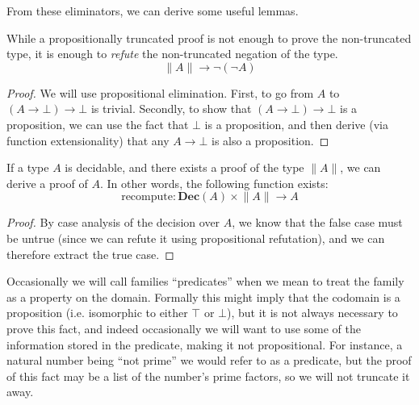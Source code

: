 \begin{refsection}
\begin{subappendices}
From these eliminators, we can derive some useful lemmas.
\begin{lemma}
  While a propositionally truncated proof is not enough to prove the
  non-truncated type, it is enough to \emph{refute} the non-truncated negation
  of the type.
  \begin{equation}
    \lVert A \rVert \rightarrow \neg (\neg A)
  \end{equation}
\end{lemma}
\begin{proof}
  We will use propositional elimination.
  First, to go from \(A\) to \((A \rightarrow \bot) \rightarrow \bot\) is
  trivial.
  Secondly, to show that \((A \rightarrow \bot) \rightarrow \bot\) is a
  proposition, we can use the fact that \(\bot\) is a proposition, and then
  derive (via function extensionality) that any \(A \rightarrow \bot\) is also a
  proposition.
\end{proof}

\begin{lemma}[Recomputation]
  If a type \(A\) is decidable, and there exists a proof of the type \(\lVert A
  \rVert\), we can derive a proof of \(A\).
  In other words, the following function exists:
  \begin{equation}
    \text{recompute} : \textbf{Dec}(A) \times \lVert A \rVert \rightarrow A
  \end{equation}
\end{lemma}
\begin{proof}
  By case analysis of the decision over \(A\), we know that the false case must
  be untrue (since we can refute it using propositional refutation), and we can
  therefore extract the true case.
\end{proof}

Occasionally we will call families ``predicates'' when we mean to treat the
family as a property on the domain.
Formally this might imply that the codomain is a proposition (i.e. isomorphic to
either \(\top\) or \(\bot\)), but it is not always necessary to prove this fact,
and indeed occasionally we will want to use some of the information stored in
the predicate, making it not propositional.
For instance, a natural number being ``not prime'' we would refer to as a
predicate, but the proof of this fact may be a list of the number's prime
factors, so we will not truncate it away.


\end{subappendices}
\end{refsection}
